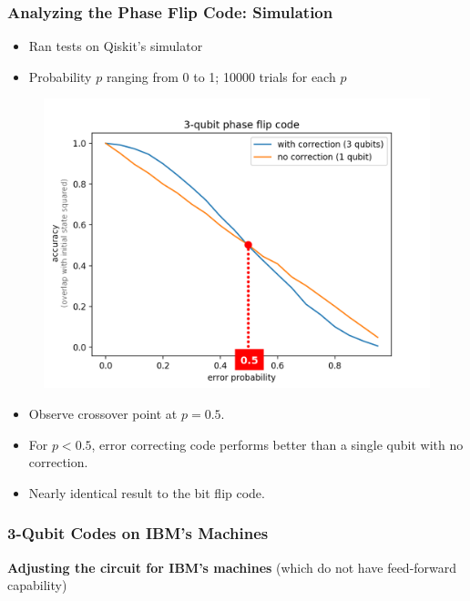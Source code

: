 \documentclass{beamer}
\begin{document}
\begin{frame}
    \frametitle{Analyzing the Phase Flip Code: Simulation}
    \begin{itemize}
        \item Ran tests on Qiskit's simulator
        \item Probability $p$ ranging from 0 to 1; 10000 trials for each $p$
        
        
    \end{itemize}
    \begin{minipage}{0.45\textwidth}
        \begin{figure}[H]
        \includegraphics[scale=0.16]{3qb-pf-overlay.png}
        \end{figure}
        \end{minipage} \hfill
        \begin{minipage}{0.45\textwidth}
        \begin{itemize}
        \item Observe crossover point at $p=0.5$.
        \item For $p<0.5$, error correcting code performs better than a single qubit with no correction.
        \item Nearly identical result to the bit flip code.
        \end{itemize}
    \end{minipage}
\end{frame}

\begin{frame}
    \frametitle{3-Qubit Codes on IBM's Machines}
   
    \textbf{Adjusting the circuit for IBM's machines} (which do not have feed-forward capability)
    
\end{frame}
\end{document}
